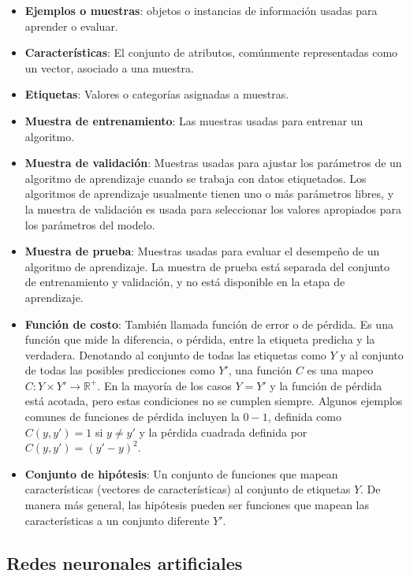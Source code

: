 \begin{itemize}

\item
  \textbf{Ejemplos o muestras}: objetos o instancias de información usadas para
  aprender o evaluar.
 \item
 \textbf{Características}: El conjunto de atributos, comúnmente representadas
como un vector, asociado a una muestra. 
\item 
\textbf{Etiquetas}: Valores o categorías
asignadas a muestras. 
\item \textbf{Muestra de entrenamiento}: Las muestras usadas
para entrenar un algoritmo. 
\item 
\textbf{Muestra de validación}: Muestras usadas
para ajustar los parámetros de un algoritmo de aprendizaje cuando se
trabaja con datos etiquetados. Los algoritmos de aprendizaje usualmente
tienen uno o más parámetros libres, y la muestra de validación es usada
para seleccionar los valores apropiados para los parámetros del modelo.
\item 
\textbf{Muestra de prueba}: Muestras usadas para evaluar el desempeño de un
algoritmo de aprendizaje. La muestra de prueba está separada del
conjunto de entrenamiento y validación, y no está disponible en la etapa
de aprendizaje. 
\item
\textbf{Función de costo}: También llamada función de error o de pérdida. 
Es una función que mide la
diferencia, o pérdida, entre la etiqueta predicha y la verdadera.
Denotando al conjunto de todas las etiquetas como $Y$ y al conjunto de
todas las posibles predicciones como $Y'$, una función $C$ es una mapeo $C: Y
 \times Y' \rightarrow \mathbb{R}^+$. En la mayoría de los casos $Y = Y'$ y la función
de pérdida está acotada, pero estas condiciones no se cumplen siempre.
Algunos ejemplos comunes de funciones de pérdida incluyen la $0-1$,
definida como $C(y, y') = 1$ si $y \neq y'$ y la pérdida cuadrada definida por
$C(y, y') = (y' - y)^2$. 
\item
\textbf{Conjunto de hipótesis}: Un conjunto de
funciones que mapean características (vectores de características) al
conjunto de etiquetas $Y$. De manera más general, las hipótesis pueden ser
funciones que mapean las características a un conjunto diferente $Y'$.
\end{itemize}



\subsection{Redes neuronales artificiales}


